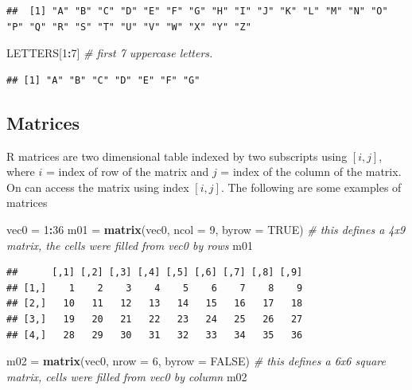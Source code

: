 \documentclass[
]{book}
\newenvironment{Shaded}{\begin{snugshade}}{\end{snugshade}}
\newcommand{\AttributeTok}[1]{\textcolor[rgb]{0.13,0.29,0.53}{#1}}
\newcommand{\CommentTok}[1]{\textcolor[rgb]{0.56,0.35,0.01}{\textit{#1}}}
\newcommand{\ConstantTok}[1]{\textcolor[rgb]{0.56,0.35,0.01}{#1}}
\newcommand{\DecValTok}[1]{\textcolor[rgb]{0.00,0.00,0.81}{#1}}
\newcommand{\FunctionTok}[1]{\textcolor[rgb]{0.13,0.29,0.53}{\textbf{#1}}}
\newcommand{\NormalTok}[1]{#1}
\newcommand{\OtherTok}[1]{\textcolor[rgb]{0.56,0.35,0.01}{#1}}
\newcommand{\SpecialCharTok}[1]{\textcolor[rgb]{0.81,0.36,0.00}{\textbf{#1}}}
\begin{document}
\begin{verbatim}
##  [1] "A" "B" "C" "D" "E" "F" "G" "H" "I" "J" "K" "L" "M" "N" "O" "P" "Q" "R" "S" "T" "U" "V" "W" "X" "Y" "Z"
\end{verbatim}

\begin{Shaded}
\begin{Highlighting}[]
\NormalTok{LETTERS[}\DecValTok{1}\SpecialCharTok{:}\DecValTok{7}\NormalTok{]                        }\CommentTok{\# first 7 uppercase letters.}
\end{Highlighting}
\end{Shaded}

\begin{verbatim}
## [1] "A" "B" "C" "D" "E" "F" "G"
\end{verbatim}

\hypertarget{matrices}{%
\subsection{Matrices}\label{matrices}}

R matrices are two dimensional table indexed by two subscripts using \([i,j]\), where \(i\) = index of row of the matrix and \(j\) = index of the column of the matrix. On can access the matrix using index \([i,j]\). The following are some examples of matrices

\begin{Shaded}
\begin{Highlighting}[]
\NormalTok{vec0 }\OtherTok{=} \DecValTok{1}\SpecialCharTok{:}\DecValTok{36}
\NormalTok{m01 }\OtherTok{=} \FunctionTok{matrix}\NormalTok{(vec0, }\AttributeTok{ncol =} \DecValTok{9}\NormalTok{, }\AttributeTok{byrow =} \ConstantTok{TRUE}\NormalTok{)   }\CommentTok{\# this defines a 4x9 matrix, the cells were filled from vec0 by rows}
\NormalTok{m01 }
\end{Highlighting}
\end{Shaded}

\begin{verbatim}
##      [,1] [,2] [,3] [,4] [,5] [,6] [,7] [,8] [,9]
## [1,]    1    2    3    4    5    6    7    8    9
## [2,]   10   11   12   13   14   15   16   17   18
## [3,]   19   20   21   22   23   24   25   26   27
## [4,]   28   29   30   31   32   33   34   35   36
\end{verbatim}

\begin{Shaded}
\begin{Highlighting}[]
\NormalTok{m02 }\OtherTok{=} \FunctionTok{matrix}\NormalTok{(vec0, }\AttributeTok{nrow =} \DecValTok{6}\NormalTok{, }\AttributeTok{byrow =} \ConstantTok{FALSE}\NormalTok{)  }\CommentTok{\# this defines a 6x6 square matrix, cells were filled from vec0 by column}
\NormalTok{m02}
\end{Highlighting}
\end{Shaded}
\end{document}
